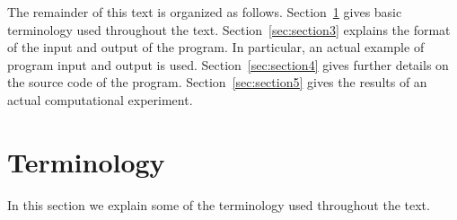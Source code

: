 \documentclass[11pt,titlepage,dvipdfmx,twoside]{article}
\begin{document}
The remainder of this text is organized as follows. 
Section~\ref{sec:section2} gives basic terminology used throughout the text.
Section~\ref{sec:section3} explains the format of the input and output of the program.
In particular, an actual example of program input and output is used.
Section~\ref{sec:section4} gives further details on the source code of the program.
Section~\ref{sec:section5} gives the results of an actual computational experiment.

\newpage

\section{Terminology}
\label{sec:section2}

In this section we explain some of the terminology used throughout the text. 
\end{document}
